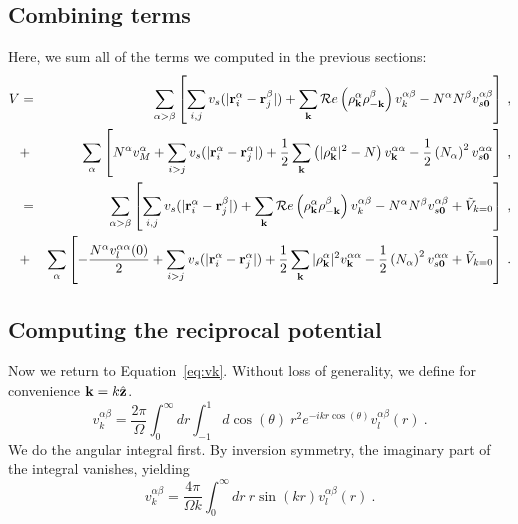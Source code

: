 \subsection{Combining terms}
Here, we sum all of the terms we computed in the previous sections:
\begin{eqnarray}
V & = & \sum_{\alpha > \beta} \left[\sum_{i,j} v_s(|\mathbf{r}_i^\alpha
  -\mathbf{r}_j^\beta|) + \sum_{\mathbf{k}} \mathcal{R}e\left(\rho_{\mathbf{k}}^\alpha
  \rho_{-\mathbf{k}}^\beta\right)v^{\alpha\beta}_k  -N^\alpha N^\beta
  v^{\alpha \beta}_{s\mathbf{0}}  \right] \nonumber\:, \\
& + & \sum_\alpha \left[ N^\alpha v_M^\alpha + \sum_{i>j} v_s(|\mathbf{r}_i^\alpha -
  \mathbf{r}_j^\alpha|) + \frac{1}{2} \sum_{\mathbf{k}} \left( |\rho_{\mathbf{k}}^\alpha|^2 -
  N\right) v^{\alpha\alpha}_{\mathbf{k}} -\frac{1}{2}\left(N_\alpha\right)^2 v_{s\mathbf{0}}^{\alpha\alpha}\right] \nonumber\:, \\
& = & \sum_{\alpha > \beta} \left[\sum_{i,j} v_s(|\mathbf{r}_i^\alpha
  -\mathbf{r}_j^\beta|) + \sum_{\mathbf{k}} \mathcal{R}e\left(\rho_{\mathbf{k}}^\alpha
  \rho_{-\mathbf{k}}^\beta\right) v^{\alpha \beta}_k   -N^\alpha N^\beta
  v^{\alpha \beta}_{s\mathbf{0}}  +\tilde{V}_{k=0} \right]\:, \\
& + & \sum_\alpha \left[ -\frac{N^\alpha v_l^{\alpha \alpha}(0)}{2}  + \sum_{i>j} v_s(|\mathbf{r}_i^\alpha -
  \mathbf{r}_j^\alpha|) + \frac{1}{2} \sum_{\mathbf{k}} |\rho_{\mathbf{k}}^\alpha|^2 v^{\alpha\alpha}_{\mathbf{k}} - \frac{1}{2}\left(N_\alpha\right)^2
  v_{s\mathbf{0}}^{\alpha\alpha} +\tilde{V}_{k=0}\right]  \nonumber\:.
\end{eqnarray}

\subsection {Computing the reciprocal potential}
Now we return to Equation~\ref{eq:vk}.  Without loss of generality, we define
for convenience $\mathbf{k} = k\hat{\mathbf{z}}$.
\begin{equation}
v^{\alpha \beta}_k = \frac{2\pi}{\Omega} \int_0^\infty dr \int_{-1}^1
  d\cos(\theta) \ r^2 e^{-i k r \cos(\theta)} v_l^{\alpha \beta}(r)\:.
\end{equation}
We do the angular integral first.  By inversion symmetry, the
imaginary part of the integral vanishes, yielding
\begin{equation}
v^{\alpha \beta}_k = \frac{4\pi}{\Omega k}\int _0^\infty dr\ r \sin(kr)
v^{\alpha \beta}_l(r)\:.
\label{eq:vkint}
\end{equation}

